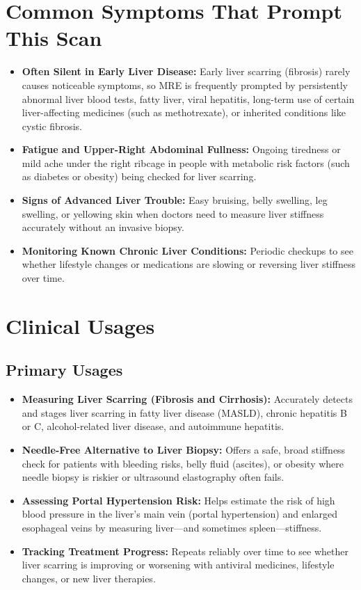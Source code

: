 \section{Common Symptoms That Prompt This Scan}
\begin{itemize}
\item \textbf{Often Silent in Early Liver Disease:} Early liver scarring (fibrosis) rarely causes noticeable symptoms, so MRE is frequently prompted by persistently abnormal liver blood tests, fatty liver, viral hepatitis, long-term use of certain liver-affecting medicines (such as methotrexate), or inherited conditions like cystic fibrosis.
\item \textbf{Fatigue and Upper-Right Abdominal Fullness:} Ongoing tiredness or mild ache under the right ribcage in people with metabolic risk factors (such as diabetes or obesity) being checked for liver scarring.
\item \textbf{Signs of Advanced Liver Trouble:} Easy bruising, belly swelling, leg swelling, or yellowing skin when doctors need to measure liver stiffness accurately without an invasive biopsy.
\item \textbf{Monitoring Known Chronic Liver Conditions:} Periodic checkups to see whether lifestyle changes or medications are slowing or reversing liver stiffness over time.
\end{itemize}

\section{Clinical Usages}

\subsection{Primary Usages}
\begin{itemize}
\item \textbf{Measuring Liver Scarring (Fibrosis and Cirrhosis):} Accurately detects and stages liver scarring in fatty liver disease (MASLD), chronic hepatitis B or C, alcohol-related liver disease, and autoimmune hepatitis.
\item \textbf{Needle-Free Alternative to Liver Biopsy:} Offers a safe, broad stiffness check for patients with bleeding risks, belly fluid (ascites), or obesity where needle biopsy is riskier or ultrasound elastography often fails.
\item \textbf{Assessing Portal Hypertension Risk:} Helps estimate the risk of high blood pressure in the liver's main vein (portal hypertension) and enlarged esophageal veins by measuring liver---and sometimes spleen---stiffness.
\item \textbf{Tracking Treatment Progress:} Repeats reliably over time to see whether liver scarring is improving or worsening with antiviral medicines, lifestyle changes, or new liver therapies.
\end{itemize}

